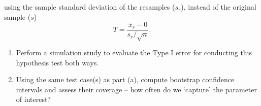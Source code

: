 \documentclass{article}\usepackage[]{graphicx}\usepackage[]{xcolor}
\begin{document}
\begin{enumerate}
using the sample standard deviation of the resamples ($s_r$), instead of the 
original sample ($s$)
  \[T = \frac{\bar{x}_r - 0}{s_r/\sqrt{n}}.\]
\begin{enumerate}
  \item Perform a simulation study to evaluate the Type I error for conducting this
hypothesis test both ways.
  \item Using the same test case(s) as part (a), compute bootstrap confidence 
  intervals and assess their coverage -- how often do we `capture' the parameter
of interest?
\end{enumerate}
\end{enumerate}

\end{document}

